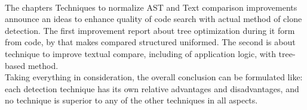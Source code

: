 \documentclass{report}
\begin{document}
\\
The chapters Techniques to normalize AST and Text comparison improvements announce an ideas to enhance quality of code search with actual method of clone detection. The first improvement report about tree optimization during it form from code, by that makes compared structured uniformed. The second is about technique to improve textual compare, including of application logic, with tree-based method.
\\
Taking everything in consideration, the overall conclusion can be formulated like: each detection technique has its own relative advantages and disadvantages, and no technique is superior to any of the other techniques in all aspects.

\end{document}
